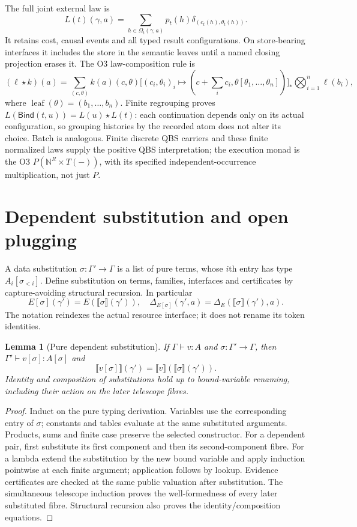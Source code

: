 \documentclass[11pt,a4paper]{article}
\newtheorem{lemma}[theorem]{Lemma}
\theoremstyle{definition}
\newcommand{\leaf}{\operatorname{leaf}}
\newcommand{\Bind}{\mathsf{Bind}}
\newcommand{\den}[1]{\llbracket #1\rrbracket}
\begin{document}
The full joint external law is
\begin{equation}\label{eq:law}
 L(t)(\gamma,a)=\sum_{h\in\Omega_t(\gamma,a)}p_t(h)
                         \delta_{(c_t(h),\theta_t(h))}.
\end{equation}
It retains cost, causal events and all typed result configurations. On
store-bearing interfaces it includes the store in the semantic leaves
until a named closing projection erases it. The O3 law-composition rule is
\begin{equation}\label{eq:law-compose}
 (\ell\star k)(a)=\sum_{(c,\theta)}k(a)(c,\theta)
 \bigl[(c_i,\theta_i)_i\mapsto
       (c+\textstyle\sum_ic_i,\theta[\theta_1,\ldots,\theta_n])\bigr]_*
           \bigotimes_{i=1}^n\ell(b_i),
\end{equation}
where $\leaf(\theta)=(b_1,\ldots,b_n)$. Finite regrouping proves
$L(\Bind(t,u))=L(u)\star L(t)$: each continuation depends only on its
actual configuration, so grouping histories by the recorded atom does
not alter its choice. Batch is analogous. Finite discrete QBS carriers
and these finite normalized laws supply the positive QBS interpretation;
the execution monad is the O3 $P(\mathbb N^R\times T(-))$, with its
specified independent-occurrence multiplication, not just $P$.

\section{Dependent substitution and open plugging}\label{sec:substitution}
A data substitution $\sigma:\Gamma'\to\Gamma$ is a list of pure terms,
whose $i$th entry has type $A_i[\sigma_{<i}]$. Define substitution on terms,
families, interfaces and certificates by capture-avoiding structural
recursion. In particular
\[
 E[\sigma](\gamma')=E(\den\sigma(\gamma')),
 \quad
 \Delta_{E[\sigma]}(\gamma',a)=
           \Delta_E(\den\sigma(\gamma'),a).
\]
The notation reindexes the actual resource interface; it does not rename
its token identities.

\begin{lemma}[Pure dependent substitution]\label{lem:pure-substitution}
If $\Gamma\vdash v:A$ and $\sigma:\Gamma'\to\Gamma$, then
$\Gamma'\vdash v[\sigma]:A[\sigma]$ and
\[
 \den{v[\sigma]}(\gamma')
      =\den v(\den\sigma(\gamma')).
\]
Identity and composition of substitutions hold up to bound-variable
renaming, including their action on the later telescope fibres.
\end{lemma}
\begin{proof}
Induct on the pure typing derivation. Variables use the corresponding
entry of $\sigma$; constants and tables evaluate at the same substituted
arguments. Products, sums and finite case preserve the selected constructor.
For a dependent pair, first substitute its first component and then its
second-component fibre. For a lambda extend the substitution by the new
bound variable and apply induction pointwise at each finite argument;
application follows by lookup. Evidence certificates are checked at the
same public valuation after substitution. The simultaneous telescope
induction proves the well-formedness of every later substituted fibre.
Structural recursion also proves the identity/composition equations.
\end{proof}
\end{document}

